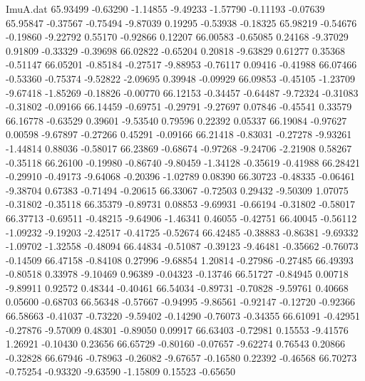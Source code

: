 \begin{filecontents}{ImuA.dat}
  65.93499   -0.63290   -1.14855   -9.49233   -1.57790   -0.11193   -0.07639
  65.95847   -0.37567   -0.75494   -9.87039    0.19295   -0.53938   -0.18325
  65.98219   -0.54676   -0.19860   -9.22792    0.55170   -0.92866    0.12207
  66.00583   -0.65085    0.24168   -9.37029    0.91809   -0.33329   -0.39698
  66.02822   -0.65204    0.20818   -9.63829    0.61277    0.35368   -0.51147
  66.05201   -0.85184   -0.27517   -9.88953   -0.76117    0.09416   -0.41988
  66.07466   -0.53360   -0.75374   -9.52822   -2.09695    0.39948   -0.09929
  66.09853   -0.45105   -1.23709   -9.67418   -1.85269   -0.18826   -0.00770
  66.12153   -0.34457   -0.64487   -9.72324   -0.31083   -0.31802   -0.09166
  66.14459   -0.69751   -0.29791   -9.27697    0.07846   -0.45541    0.33579
  66.16778   -0.63529    0.39601   -9.53540    0.79596    0.22392    0.05337
  66.19084   -0.97627    0.00598   -9.67897   -0.27266    0.45291   -0.09166
  66.21418   -0.83031   -0.27278   -9.93261   -1.44814    0.88036   -0.58017
  66.23869   -0.68674   -0.97268   -9.24706   -2.21908    0.58267   -0.35118
  66.26100   -0.19980   -0.86740   -9.80459   -1.34128   -0.35619   -0.41988
  66.28421   -0.29910   -0.49173   -9.64068   -0.20396   -1.02789    0.08390
  66.30723   -0.48335   -0.06461   -9.38704    0.67383   -0.71494   -0.20615
  66.33067   -0.72503    0.29432   -9.50309    1.07075   -0.31802   -0.35118
  66.35379   -0.89731    0.08853   -9.69931   -0.66194   -0.31802   -0.58017
  66.37713   -0.69511   -0.48215   -9.64906   -1.46341    0.46055   -0.42751
  66.40045   -0.56112   -1.09232   -9.19203   -2.42517   -0.41725   -0.52674
  66.42485   -0.38883   -0.86381   -9.69332   -1.09702   -1.32558   -0.48094
  66.44834   -0.51087   -0.39123   -9.46481   -0.35662   -0.76073   -0.14509
  66.47158   -0.84108    0.27996   -9.68854    1.20814   -0.27986   -0.27485
  66.49393   -0.80518    0.33978   -9.10469    0.96389   -0.04323   -0.13746
  66.51727   -0.84945    0.00718   -9.89911    0.92572    0.48344   -0.40461
  66.54034   -0.89731   -0.70828   -9.59761    0.40668    0.05600   -0.68703
  66.56348   -0.57667   -0.94995   -9.86561   -0.92147   -0.12720   -0.92366
  66.58663   -0.41037   -0.73220   -9.59402   -0.14290   -0.76073   -0.34355
  66.61091   -0.42951   -0.27876   -9.57009    0.48301   -0.89050    0.09917
  66.63403   -0.72981    0.15553   -9.41576    1.26921   -0.10430    0.23656
  66.65729   -0.80160   -0.07657   -9.62274    0.76543    0.20866   -0.32828
  66.67946   -0.78963   -0.26082   -9.67657   -0.16580    0.22392   -0.46568
  66.70273   -0.75254   -0.93320   -9.63590   -1.15809    0.15523   -0.65650

\end{filecontents}
